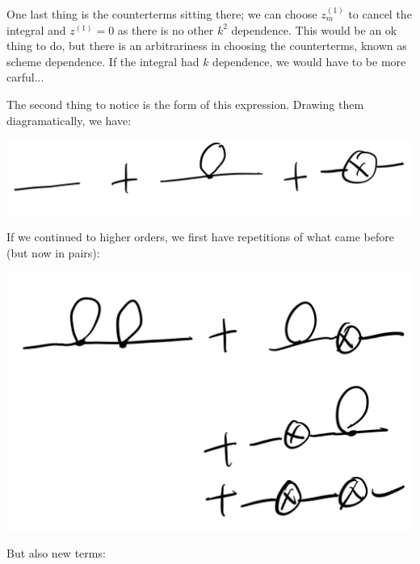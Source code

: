 One last thing is the counterterms sitting there; we can choose $z_m^{(1)}$ to cancel the integral and $z^{(1)} = 0$ as there is no other $k^2$ dependence. This would be an ok thing to do, but there is an arbitrariness in choosing the counterterms, known as scheme dependence. If the integral had $k$ dependence, we would have to be more carful...

The second thing to notice is the form of this expression. Drawing them diagramatically, we have:

\begin{center}
    \includegraphics[scale=0.3]{Images/fig-lec27feynman1.png}
\end{center}

If we continued to higher orders, we first have repetitions of what came before (but now in pairs):

\begin{center}
    \includegraphics[scale=0.3]{Images/fig-lec27feynman2.png}
\end{center}

But also new terms:

